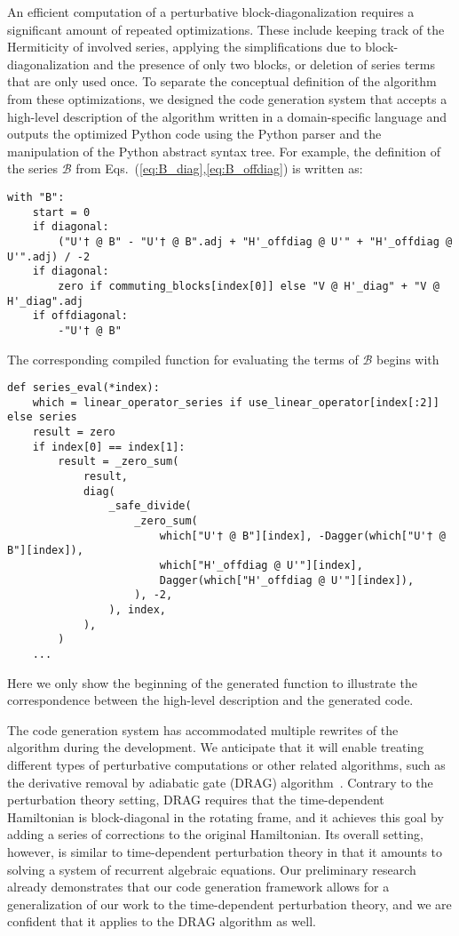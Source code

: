 An efficient computation of a perturbative block-diagonalization requires a significant amount of repeated optimizations.
These include keeping track of the Hermiticity of involved series, applying the simplifications due to block-diagonalization and the presence of only two blocks, or deletion of series terms that are only used once.
To separate the conceptual definition of the algorithm from these optimizations, we designed the code generation system that accepts a high-level description of the algorithm written in a domain-specific language and outputs the optimized Python code using the Python parser and the manipulation of the Python abstract syntax tree.
For example, the definition of the series $\mathcal{B}$ from Eqs.~(\ref{eq:B_diag},\ref{eq:B_offdiag}) is written as:
\begin{verbatim}
with "B":
    start = 0
    if diagonal:
        ("U'† @ B" - "U'† @ B".adj + "H'_offdiag @ U'" + "H'_offdiag @ U'".adj) / -2
    if diagonal:
        zero if commuting_blocks[index[0]] else "V @ H'_diag" + "V @ H'_diag".adj
    if offdiagonal:
        -"U'† @ B"
\end{verbatim}
The corresponding compiled function for evaluating the terms of $\mathcal{B}$ begins with
\begin{verbatim}
def series_eval(*index):
    which = linear_operator_series if use_linear_operator[index[:2]] else series
    result = zero
    if index[0] == index[1]:
        result = _zero_sum(
            result,
            diag(
                _safe_divide(
                    _zero_sum(
                        which["U'† @ B"][index], -Dagger(which["U'† @ B"][index]),
                        which["H'_offdiag @ U'"][index],
                        Dagger(which["H'_offdiag @ U'"][index]),
                    ), -2,
                ), index,
            ),
        )
    ...
\end{verbatim}
Here we only show the beginning of the generated function to illustrate the correspondence between the high-level description and the generated code.

The code generation system has accommodated multiple rewrites of the algorithm during the development.
We anticipate that it will enable treating different types of perturbative computations or other related algorithms, such as the derivative removal by adiabatic gate (DRAG) algorithm~\cite{Motzoi_2009,Theis_2018}.
Contrary to the perturbation theory setting, DRAG requires that the time-dependent Hamiltonian is block-diagonal in the rotating frame, and it achieves this goal by adding a series of corrections to the original Hamiltonian.
Its overall setting, however, is similar to time-dependent perturbation theory in that it amounts to solving a system of recurrent algebraic equations.
Our preliminary research already demonstrates that our code generation framework allows for a generalization of our work to the time-dependent perturbation theory, and we are confident that it applies to the DRAG algorithm as well.
